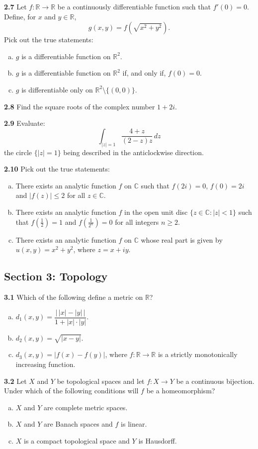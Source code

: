 \documentclass[11pt,a4paper]{article}
\newcommand{\R}{\mathbb{R}}
\newcommand{\C}{\mathbb{C}}
\newcommand{\examsec}[1]{%
  \subsection*{#1}
  \vspace{-2pt}
}
\newcommand{\qitem}[1]{\par\medskip\noindent\textbf{#1}\hspace{0.5em}}
\begin{document}
\qitem{2.7} Let $f : \R \to \R$ be a continuously differentiable function such that $f'(0) = 0$. Define, for $x$ and $y \in \R$,
\[
  g(x, y) = f\left(\sqrt{x^2 + y^2}\right).
\]
Pick out the true statements:
\begin{enumerate}[(a)]
  \item $g$ is a differentiable function on $\R^2$.
  \item $g$ is a differentiable function on $\R^2$ if, and only if, $f(0) = 0$.
  \item $g$ is differentiable only on $\R^2 \setminus \{(0, 0)\}$.
\end{enumerate}

\qitem{2.8} Find the square roots of the complex number $1 + 2i$.

\qitem{2.9} Evaluate:
\[
  \int_{|z|=1} \frac{4 + z}{(2 - z)z}\,dz
\]
the circle $\{|z| = 1\}$ being described in the anticlockwise direction.

\qitem{2.10} Pick out the true statements:
\begin{enumerate}[(a)]
  \item There exists an analytic function $f$ on $\C$ such that $f(2i) = 0$, $f(0) = 2i$ and $|f(z)| \le 2$ for all $z \in \C$.
  \item There exists an analytic function $f$ in the open unit disc $\{z \in \C : |z| < 1\}$ such that $f\left(\frac{1}{2}\right) = 1$ and $f\left(\frac{1}{2^n}\right) = 0$ for all integers $n \ge 2$.
  \item There exists an analytic function $f$ on $\C$ whose real part is given by $u(x, y) = x^2 + y^2$, where $z = x + iy$.
\end{enumerate}

\examsec{Section 3: Topology}

\qitem{3.1} Which of the following define a metric on $\R$?
\begin{enumerate}[(a)]
  \item $d_1(x, y) = \dfrac{\big|\,|x| - |y|\,\big|}{1 + |x|\cdot|y|}$.
  \item $d_2(x, y) = \sqrt{|x - y|}$.
  \item $d_3(x, y) = |f(x) - f(y)|$, where $f : \R \to \R$ is a strictly monotonically increasing function.
\end{enumerate}

\qitem{3.2} Let $X$ and $Y$ be topological spaces and let $f : X \to Y$ be a continuous bijection. Under which of the following conditions will $f$ be a homeomorphism?
\begin{enumerate}[(a)]
  \item $X$ and $Y$ are complete metric spaces.
  \item $X$ and $Y$ are Banach spaces and $f$ is linear.
  \item $X$ is a compact topological space and $Y$ is Hausdorff.
\end{enumerate}
\end{document}
